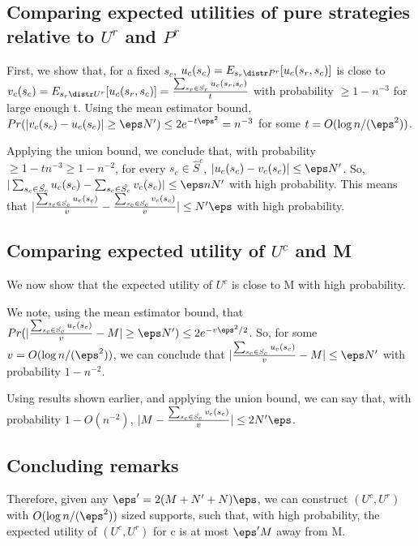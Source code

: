 \documentclass[10pt]{amsart}
\begin{document}
\subsection{Comparing expected utilities of pure strategies relative to  $U^{r}$ and $P^{r}$}
First, we show that, for a fixed $s_c$, $u_{c}(s_c) = E_{s_{r} \distr P^{r}}[u_{c}(s_{r}, s_{c})]$ is close to $v_{c}(s_c) = E_{s_{r} \distr U^{r}}[u_{c}(s_{r}, s_{c})] = \frac{\sum_{s_r \in \hat{S_r}} u_{c}(s_{r}, s_{c})}{t}$ with probability $\geq 1 - n^{-3}$ for large enough t. Using the mean estimator bound, $Pr(|v_{c}(s_c) - u_{c}(s_c)|\geq \eps N') \leq 2e^{-t\eps^{2}} = n^{-3}$ for some $t = O(\log n / (\eps^2))$.

Applying the union bound, we conclude that, with probability $\geq 1 - tn^{-3} \geq 1-n^{-2}$, for every $s_c \in \hat{S}^{c}$, $|u_{c}(s_c) - v_c(s_c)| \leq \eps N'$. So, \\
$|\sum_{s_c \in \hat{S_c}} u_{c}(s_c) - \sum_{s_c \in \hat{S_c}} v_{c}(s_c)| \leq \eps nN'$ with high probability. This means that $|\frac{\sum_{s_c \in \hat{S_c}} u_{c}(s_c)}{v} - \frac{\sum_{s_c \in \hat{S_c}} v_{c}(s_c)}{v}| \leq N'\eps$ with high probability.

\subsection{Comparing expected utility of $U^{c}$ and M}
We now show that the expected utility of $U^{c}$ is close to M with high probability.

We note, using the mean estimator bound, that $Pr(|\frac{\sum_{s_c \in \hat{S_c}} u_{c}(s_c)}{v} - M| \geq \eps N') \leq 2e^{-v\eps^{2}/2}$. So, for some $v = O(\log n / (\eps^2))$, we can conclude that $|\frac{\sum_{s_c \in \hat{S_c}} u_{c}(s_c)}{v} - M| \leq \eps N'$ with probability $1-n^{-2}$.

Using results shown earlier, and applying the union bound, we can say that, with probability $1 - O(n^{-2})$, $|M - \frac{\sum_{s_c \in \hat{S_c}} v_{c}(s_c)}{v}| \leq 2N'\eps$.

\subsection{Concluding remarks}
Therefore, given any $\eps' = 2(M + N' + N)\eps$, we can construct $(U^{c}, U^{r})$ with $O(\log n / (\eps^2))$ sized supports, such that, with high probability, the expected utility of $(U^{c}, U^{r})$ for c is at most $\eps' M$ away from M.
\end{document}
